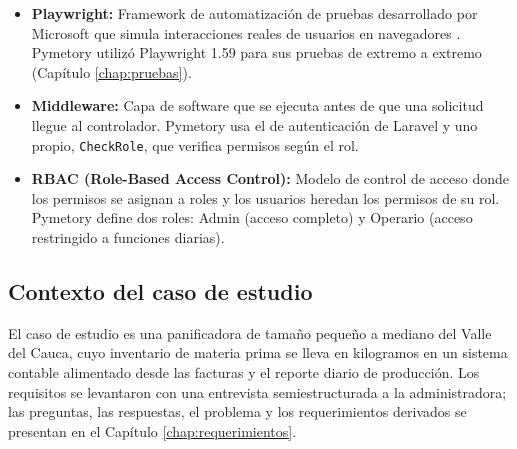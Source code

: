 \begin{itemize}
    \item \textbf{Playwright:} Framework de automatización de pruebas desarrollado por Microsoft que simula interacciones reales de usuarios en navegadores \cite{playwright}. Pymetory utilizó Playwright 1.59 para sus pruebas de extremo a extremo (Capítulo \ref{chap:pruebas}).
    
    \item \textbf{Middleware:} Capa de software que se ejecuta antes de que una solicitud llegue al controlador. Pymetory usa el de autenticación de Laravel y uno propio, \texttt{CheckRole}, que verifica permisos según el rol.
    
    \item \textbf{RBAC (Role-Based Access Control):} Modelo de control de acceso donde los permisos se asignan a roles y los usuarios heredan los permisos de su rol. Pymetory define dos roles: Admin (acceso completo) y Operario (acceso restringido a funciones diarias).
    
\end{itemize}

\subsection{Contexto del caso de estudio}
\label{sec:contexto_panificadora}

El caso de estudio es una panificadora de tamaño pequeño a mediano del Valle del Cauca, cuyo inventario de materia prima se lleva en kilogramos en un sistema contable alimentado desde las facturas y el reporte diario de producción. Los requisitos se levantaron con una entrevista semiestructurada a la administradora; las preguntas, las respuestas, el problema y los requerimientos derivados se presentan en el Capítulo \ref{chap:requerimientos}.
